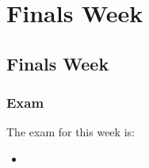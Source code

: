 \clearpage

\renewcommand{\ChapTitle}{Finals Week}
\renewcommand{\SectionTitle}{Finals Week}

\chapter{\ChapTitle}

\section{\SectionTitle}

\subsection{Exam}

The exam for this week is:

\begin{itemize}
    \item {}
\end{itemize}